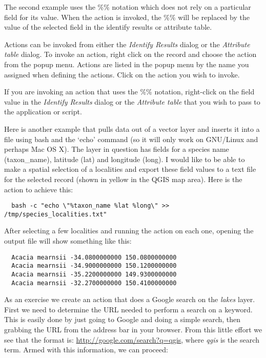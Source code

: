 The second example uses the \%\% notation which does not rely on a particular
field for its value. When the action is invoked, the \%\% will be replaced by
the value of the selected field in the identify results or attribute table.

\label{label_usingactions}

Actions can be invoked from either the \textit{Identify Results} dialog or the
\textit{Attribute table} dialog. To invoke an action, right click on the
record and choose the action from the popup menu. Actions are listed in the popup
menu by the name you assigned when defining the actions. Click on the action you
wish to invoke.

If you are invoking an action that uses the \%\% notation, right-click on the
field value in the \textit{Identify Results} dialog or the
\textit{Attribute table} that you wish to pass to the application or script.

Here is another example that pulls data out of a vector layer and inserts it
into a file using bash and the `echo' command (so it will only work on
GNU/Linux and perhaps Mac OS X). The layer in question has fields for a species name
(taxon\_name), latitude (lat) and longitude (long). I would like to be able to
make a spatial selection of a localities and export these field values to a
text file for the selected record (shown in yellow in the QGIS map area). Here is
the action to achieve this:

\begin{verbatim}
  bash -c "echo \"%taxon_name %lat %long\" >> /tmp/species_localities.txt"
\end{verbatim} 

After selecting a few localities and running the action on each one, opening
the output file will show something like this:

\begin{verbatim}
  Acacia mearnsii -34.0800000000 150.0800000000
  Acacia mearnsii -34.9000000000 150.1200000000
  Acacia mearnsii -35.2200000000 149.9300000000
  Acacia mearnsii -32.2700000000 150.4100000000
\end{verbatim} 

As an exercise we create an action that does a Google search on the 
\textsl{lakes} layer. First we need to determine the URL needed to perform a search on a
keyword. This is easily done by just going to Google and doing a simple
search, then grabbing the URL from the address bar in your browser. From this
little effort we see that the format is: \url{http://google.com/search?q=qgis},
where \textit{qgis} is the search term. Armed with this information, we can
proceed:

